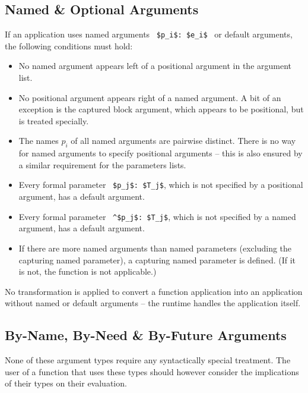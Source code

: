 \subsection{Named \& Optional Arguments}
\label{sec:named-optional-arguments}

If an application uses named arguments ~\lstinline!$p_i$: $e_i$!~ or default arguments, the following conditions must hold:
\begin{itemize}
\item No named argument appears left of a positional argument in the argument list. 
\item No positional argument appears right of a named argument. A bit of an exception is the captured block argument, which appears to be positional, but is treated specially. 
\item The names $p_i$ of all named arguments are pairwise distinct. There is no way for named arguments to specify positional arguments -- this is also ensured by a similar requirement for the parameters lists. 
\item Every formal parameter ~\lstinline!$p_j$: $T_j$!, which is not specified by a positional argument, has a default argument. 
\item Every formal parameter ~\lstinline!^$p_j$: $T_j$!, which is not specified by a named argument, has a default argument. 
\item If there are more named arguments than named parameters (excluding the capturing named parameter), a capturing named parameter is defined. (If it is not, the function is not applicable.)
\end{itemize}

No transformation is applied to convert a function application into an application without named or default arguments -- the runtime handles the application itself. 






\subsection{By-Name, By-Need \& By-Future Arguments}
\label{sec:by-name-arguments}
\label{sec:by-need-arguments}
\label{sec:by-future-arguments}

None of these argument types require any syntactically special treatment. The user of a function that uses these types should however consider the implications of their types on their evaluation. 







